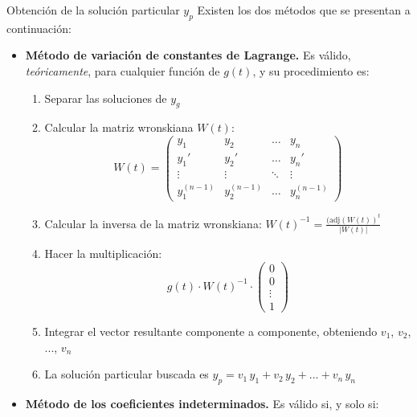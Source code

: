 \documentclass[11pt]{book} %
\makeatletter
\numberwithin{dummy}{section}
\theoremstyle{ocrenumbox}
\theoremstyle{blacknumex}
\theoremstyle{blacknumbox}
\theoremstyle{ocrenum}
\renewcommand{\subsubsection}{\@startsection {subsubsection}{3}{\z@}
{-2ex \@plus -0.1ex \@minus -.2ex}
{.2ex \@plus.2ex }
{\normalfont\small\sffamily\bfseries}}
\makeatother
\begin{document}
\subsubsection{Obtención de la solución particular $y_p$}
Existen los dos métodos que se presentan a continuación:
\begin{itemize}
    \item \textbf{Método de variación de constantes de Lagrange.} Es válido, \textit{teóricamente}, para cualquier función de $g(t)$, y su procedimiento es:
    \begin{enumerate}
        \item Separar las soluciones de $y_g$
        \item Calcular la matriz wronskiana $W(t)$:
        \begin{equation*}
            W(t)=\left( 
            \begin{matrix}
              y_1 & y_2 & \dots & y_n\\
              y_1' & y_2' & \dots & y_n'\\
              \vdots & \vdots & \ddots & \vdots\\
              y_1^{(n-1)} & y_2^{(n-1)} & \dots & y_n^{(n-1)}
            \end{matrix}\right)
        \end{equation*}
        \item Calcular la inversa de la matriz wronskiana: $W(t)^{-1}=\frac{(\mathrm{adj}(W(t))^t}{|W(t)|}$
        \item Hacer la multiplicación:
        \begin{equation*}
           g(t)\cdot W(t)^{-1}\cdot \left( \begin{matrix}
             0\\
             0\\
             \vdots\\
             1
           \end{matrix}\right)
        \end{equation*}
        \item Integrar el vector resultante componente a componente, obteniendo $v_1$, $v_2$, ..., $v_n$
        \item La solución particular buscada es $y_p=v_1\,y_1+v_2\,y_2+...+v_n\,y_n$
    \end{enumerate}
    \item \textbf{Método de los coeficientes indeterminados.} Es válido si, y solo si:
    \begin{equation*}

\end{equation*}
\end{itemize}
\end{document}

